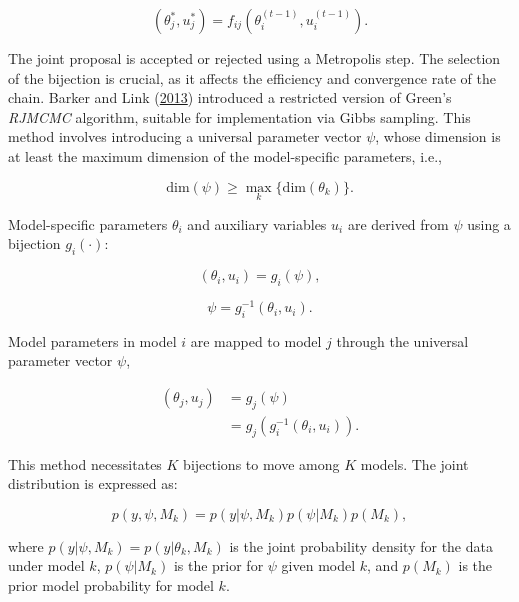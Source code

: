 \documentclass[
  11pt,
]{article}
\begin{document}
\begin{equation}
(\theta_{j}^*, u_{j}^*) = f_{ij}(\theta_{i}^{(t-1)}, u_{i}^{(t-1)}).
\end{equation}

The joint proposal is accepted or rejected using a Metropolis step. The
selection of the bijection is crucial, as it affects the efficiency and
convergence rate of the chain. Barker and Link
(\protect\hyperlink{ref-Barker2013}{2013}) introduced a restricted
version of Green's \emph{RJMCMC} algorithm, suitable for implementation
via Gibbs sampling. This method involves introducing a universal
parameter vector \(\psi\), whose dimension is at least the maximum
dimension of the model-specific parameters, i.e.,

\begin{equation}
\text{dim}(\psi) \geq \max_{k} \{\text{dim}(\theta_{k})\}.
\end{equation}

Model-specific parameters \(\theta_i\) and auxiliary variables \(u_i\)
are derived from \(\psi\) using a bijection \(g_i(\cdot)\):

\begin{equation}
(\theta_{i}, u_{i}) = g_{i}(\psi),
\end{equation}

\begin{equation}
\psi = g_{i}^{-1}(\theta_{i}, u_{i}).
\end{equation}

Model parameters in model \(i\) are mapped to model \(j\) through the
universal parameter vector \(\psi\),

\begin{equation}
\begin{split}
(\theta_{j}, u_{j}) &= g_{j}(\psi) \\
                    &= g_{j}(g_{i}^{-1}(\theta_{i}, u_{i})).
\end{split}
\end{equation}

This method necessitates \(K\) bijections to move among \(K\) models.
The joint distribution is expressed as:

\begin{equation}
p(y,\psi,M_k)=p(y|\psi,M_k)p(\psi|M_k)p(M_k),
\end{equation}

where \(p(y|\psi,M_k)=p(y|\theta_k,M_k)\) is the joint probability
density for the data under model \(k\), \(p(\psi|M_k)\) is the prior for
\(\psi\) given model \(k\), and \(p(M_k)\) is the prior model
probability for model \(k\).
\end{document}
